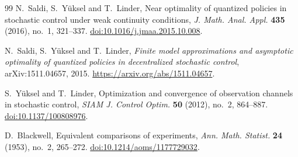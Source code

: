 \begin{thebibliography}{99}
N.~Saldi, S.~Y\"uksel and T.~Linder, Near optimality of quantized policies
in stochastic control under weak continuity conditions,
\emph{J. Math. Anal. Appl.} \textbf{435} (2016), no.~1, 321--337.
\href{https://doi.org/10.1016/j.jmaa.2015.10.008}{doi:10.1016/j.jmaa.2015.10.008}.

N.~Saldi, S.~Y\"uksel and T.~Linder, \emph{Finite model approximations
and asymptotic optimality of quantized policies in decentralized
stochastic control}, arXiv:1511.04657, 2015.
\url{https://arxiv.org/abs/1511.04657}.

S.~Y\"uksel and T.~Linder, Optimization and convergence of observation
channels in stochastic control, \emph{SIAM J. Control Optim.}
\textbf{50} (2012), no.~2, 864--887.
\href{https://doi.org/10.1137/100808976}{doi:10.1137/100808976}.

D.~Blackwell, Equivalent comparisons of experiments,
\emph{Ann. Math. Statist.} \textbf{24} (1953), no.~2, 265--272.
\href{https://doi.org/10.1214/aoms/1177729032}{doi:10.1214/aoms/1177729032}.
\end{thebibliography}
